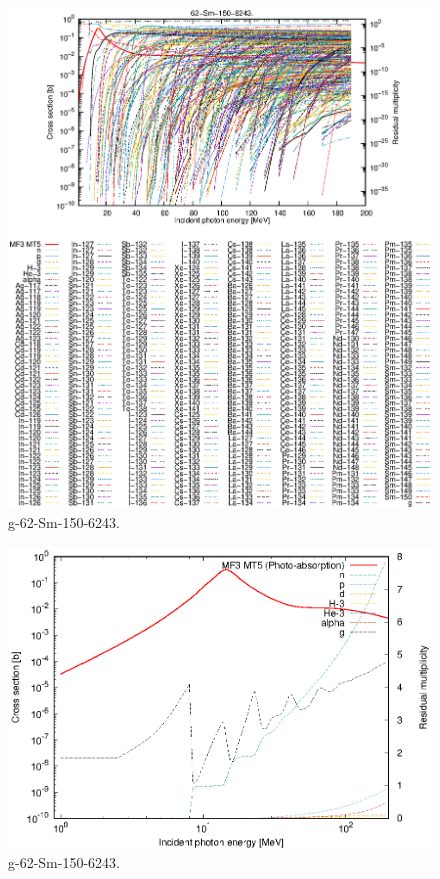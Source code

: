 \begin{figure}
 \includegraphics[width=\linewidth]{eps/g_62-Sm-150_6243.eps}
  \caption{g-62-Sm-150-6243.}
\end{figure}
\newpage \clearpage

\begin{figure}
 \includegraphics[width=\linewidth]{eps-log/g_62-Sm-150_6243.eps}
 \caption{g-62-Sm-150-6243.}
\end{figure}
\newpage \clearpage

